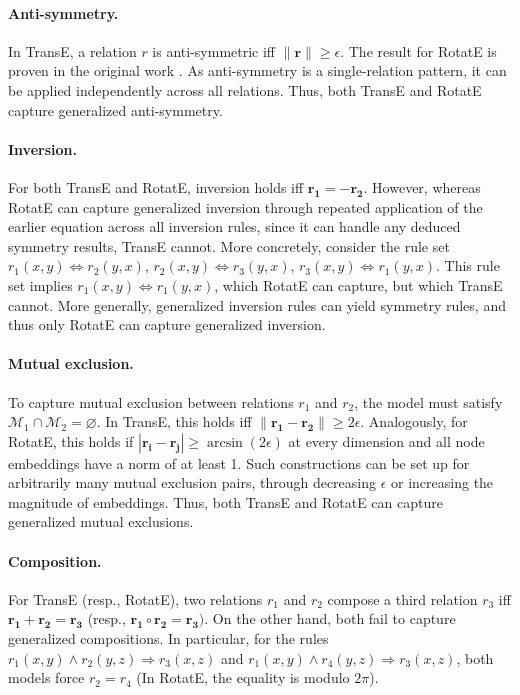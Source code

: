 \documentclass{article}
\begin{document}
\paragraph{Anti-symmetry.} In TransE, a relation $r$ is anti-symmetric iff ${\| \bm r \| \geq \epsilon}$. The result for RotatE is proven in the original work \cite{RotatE-ICLR19}. As anti-symmetry is a single-relation pattern, it can be applied independently across all relations. Thus, both TransE and RotatE capture generalized anti-symmetry. 

\paragraph{Inversion.} For both TransE and RotatE, inversion holds iff $\bm{r_1} = - \bm{r_2}$. However, whereas RotatE can capture generalized inversion through repeated application of the earlier equation across all inversion rules, since it can handle any deduced symmetry results, TransE cannot. 
More concretely, consider the rule set ${r_1(x,y) \Leftrightarrow r_2(y,x)}$, ${r_2(x,y) \Leftrightarrow r_3(y,x)}$, ${r_3(x,y) \Leftrightarrow r_1(y,x)}$. This rule set implies ${r_1(x,y)  \Leftrightarrow r_1(y,x)}$, which RotatE can capture, but which TransE cannot. More generally, generalized inversion rules can yield symmetry rules, and thus only RotatE can capture generalized inversion.

\paragraph{Mutual exclusion.}
To capture mutual exclusion between relations $r_1$ and $r_2$, the model must satisfy ${\mathcal M_1 \cap \mathcal M_2 = \varnothing}$. In TransE, this holds iff  $\|\bm {r_1} - \bm {r_2}\| \geq 2\epsilon$. Analogously, for RotatE, this holds if $|\bm {r_i} - \bm {r_j}| \geq \arcsin(2\epsilon)$ at every dimension and all node embeddings have a norm of at least 1. Such constructions can be set up for arbitrarily many mutual exclusion pairs, through decreasing $\epsilon$ or increasing the magnitude of embeddings. Thus, both TransE and RotatE can capture generalized mutual exclusions.

\paragraph{Composition.} For TransE (resp., RotatE), two relations $r_1$ and $r_2$ compose a third relation $r_3$ iff  $\bm {r_1} + \bm {r_2} = \bm {r_3}$ (resp., $\bm{r_1} \circ \bm{r_2} = \bm{r_3})$. On the other hand, both fail to capture generalized compositions. In particular, for the rules $r_1(x,y) \land r_2(y,z) \Rightarrow r_3(x,z)$ and $r_1(x,y) \land r_4(y,z) \Rightarrow r_3(x,z)$, both models  force $r_2 = r_4$ (In RotatE, the equality is modulo $2\pi$). 
\end{document}
